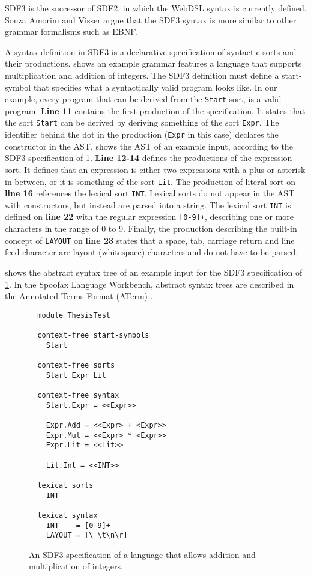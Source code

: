       SDF3 is the successor of SDF2, in which the WebDSL syntax is currently defined. Souza Amorim and Visser \citeyear{AmorimV20} argue that the SDF3 syntax is more similar to other grammar formalisms such as EBNF.

      A syntax definition in SDF3 is a declarative specification of syntactic sorts and their productions.  shows an example grammar features a language that supports multiplication and addition of integers. The SDF3 definition must define a start-symbol that specifies what a syntactically valid program looks like. In our example, every program that can be derived from the \texttt{Start} sort, is a valid program. \textbf{Line 11} contains the first production of the specification. It states that the sort \texttt{Start} can be derived by deriving something of the sort \texttt{Expr}. The identifier behind the dot in the production (\texttt{Expr} in this case) declares the constructor in the AST.  shows the AST of an example input, according to the SDF3 specification of \cref{fig:sdf3-sorts-and-productions-syntax}. \textbf{Line 12-14} defines the productions of the expression sort. It defines that an expression is either two expressions with a plus or asterisk in between, or it is something of the sort \texttt{Lit}. The production of literal sort on \textbf{line 16} references the lexical sort \texttt{INT}. Lexical sorts do not appear in the AST with constructors, but instead are parsed into a string. The lexical sort \texttt{INT} is defined on \textbf{line 22} with the regular expression \texttt{[0-9]+}, describing one or more characters in the range of 0 to 9. Finally, the production describing the built-in concept of \texttt{LAYOUT} on \textbf{line 23} states that a space, tab, carriage return and line feed character are layout (whitespace) characters and do not have to be parsed.

       shows the abstract syntax tree of an example input for the SDF3 specification of \cref{fig:sdf3-sorts-and-productions-syntax}. In the Spoofax Language Workbench, abstract syntax trees are described in the Annotated Terms Format (ATerm) \autocite{BrandJKO00}.

      \begin{figure}
        \begin{verbatim}
  module ThesisTest

  context-free start-symbols
    Start

  context-free sorts
    Start Expr Lit

  context-free syntax
    Start.Expr = <<Expr>>

    Expr.Add = <<Expr> + <Expr>>
    Expr.Mul = <<Expr> * <Expr>>
    Expr.Lit = <<Lit>>

    Lit.Int = <<INT>>

  lexical sorts
    INT

  lexical syntax
    INT    = [0-9]+
    LAYOUT = [\ \t\n\r]
        \end{verbatim}
        \caption{\label{fig:sdf3-sorts-and-productions-syntax}An SDF3 specification of a language that allows addition and multiplication of integers.}
      \end{figure}


